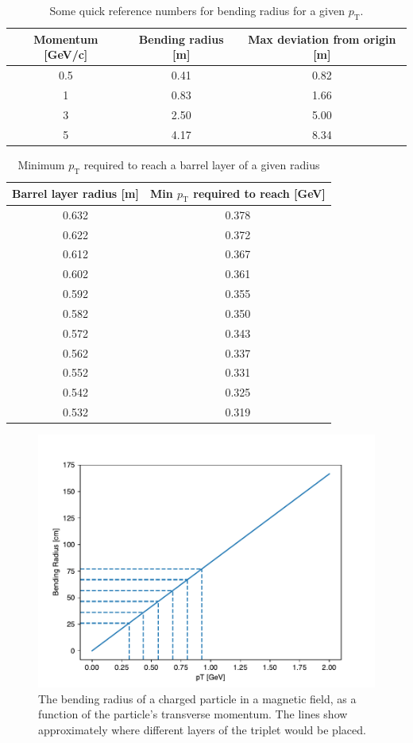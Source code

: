 \documentclass[a4paper, 12pt]{article}
\newcommand{\pt}{\ensuremath{p_{\mathrm{T}}}\xspace}
\begin{document}
\begin{table}
  \centering
  \begin{tabular}{ccc}
    \toprule
    Momentum [GeV/c] & Bending radius [m] & Max deviation from origin [m] \\ 
    \midrule
    0.5 & 0.41 & 0.82 \\
    1 & 0.83   & 1.66 \\ 
    3 & 2.50   & 5.00 \\ 
    5 & 4.17   & 8.34 \\ 
    \bottomrule
  \end{tabular}
  \caption{Some quick reference numbers for bending radius for a given \pt.}
  \label{tab:brquick}
\end{table}

\begin{table}
  \centering
  \begin{tabular}{cc}
    \toprule
    Barrel layer radius [m] & Min \pt required to reach [GeV] \\ 
    \midrule 
    0.632 & 0.378 \\
    0.622 & 0.372 \\
    0.612 & 0.367 \\
    0.602 & 0.361 \\
    0.592 & 0.355 \\
    0.582 & 0.350 \\
    0.572 & 0.343 \\
    0.562 & 0.337 \\
    0.552 & 0.331 \\ 
    0.542 & 0.325 \\
    0.532 & 0.319 \\
    \bottomrule
  \end{tabular}
  \caption{Minimum \pt required to reach a barrel layer of a given radius}
\end{table}



\begin{figure}
  \centering
\includegraphics[width=0.5\linewidth]{images/bendingRvP}
  \caption{The bending radius of a charged particle in a magnetic field, as a function of the particle's transverse momentum. 
  The lines show approximately where different layers of the triplet would be placed. }
  \label{fig:bendingRvP}
\end{figure}
\end{document}
